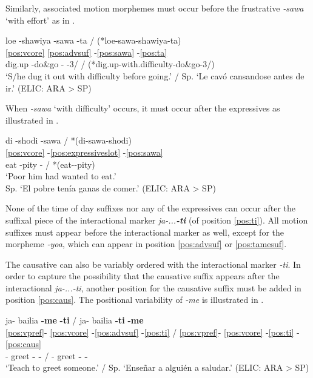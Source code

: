\documentclass[output=paper,hidelinks]{langscibook}
\begin{document}
Similarly, associated motion morphemes must occur before the frustrative \textit{-sawa} `with effort' as in .

\ea \label{ex:shawiyasawa}
    \glll loe -shawiya -sawa -ta / (*loe-sawa-shawiya-ta) \\
    \ref{pos:vcore} \ref{pos:advsuf} -\ref{pos:sawa} -\ref{pos:ta} \\
    dig.up -do\&go -\Frust{} -3\Aarg{}/\Tpl{} / (*dig.up-with.difficulty-do\&go-3\Aarg{}/\Tpl{})   \\
    \glt `S/he dug it out with difficulty before going.' / Sp. `Le cavó cansandose antes de ir.'  \hfill (ELIC: ARA > SP)
\z 

When \textit{-sawa} `with difficulty' occurs, it must occur after the expressives as illustrated in .

\ea \label{ex:shodisawa}
    \glll di -shodi -sawa / *(di-sawa-shodi)  \\
    \ref{pos:vcore} -\ref{pos:expressiveslot} -\ref{pos:sawa}   \\
    	eat -pity -\Cntrfct{} / *(eat-\Cntrfct{}-pity)  \\
	\glt `Poor him had wanted to eat.'	\\ Sp. `El pobre tenía ganas de comer.'
 \hfill (ELIC: ARA > SP)
\z


None of the time of day suffixes nor any of the expressives can occur after the suffixal piece of the interactional marker \textit{ja-...\textbf{-ti}} (of position \ref{pos:ti}). All motion suffixes must appear before the interactional marker as well, except for the morpheme \textit{-yoa}, which can appear in position \ref{pos:advsuf} or \ref{pos:tamesuf}.

The causative can also be variably ordered with the interactional marker \textit{-ti}. In order to capture the possibility that the causative suffix appears after the interactional \textit{ja-...{-ti}}, another position for the causative suffix must be added in position \ref{pos:caus}. The positional variability of \textit{-me} is illustrated in .

\ea \label{ex:metitime}
    \glll ja- bailia \textbf{-me} \textbf{-ti} / ja- bailia \textbf{-ti} \textbf{-me}  \\
		  \ref{pos:vpref}- \ref{pos:vcore} -\ref{pos:advsuf} -\ref{pos:ti} / \ref{pos:vpref}- \ref{pos:vcore} -\ref{pos:ti} -\ref{pos:caus}    \\
		\Intrc{}- greet \textbf{-\Caus{}} \textbf{-\Intrc{}} / \Intrc{}- greet \textbf{-\Intrc{}} \textbf{-\Caus{}} \\
	\glt `Teach to greet someone.’ / Sp. `Enseñar a alguién a saludar.' 
 \hfill (ELIC: ARA > SP)
\z
\end{document}
